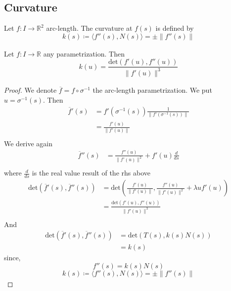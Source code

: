 \subsection{Curvature}
\label{subsec:Curvature}
\begin{defn}[Curvature]
    Let $ f : I \to \mathbb{R}^2 $ arc-length. The curvature at $ f(s)  $ is defined by 
    \[
        k(s) \coloneqq \langle f''(s)  , N(s)  \rangle = \pm \| f''(s) \|^{ }_{ } 
    \]
    \label{def:Curvature}
\end{defn}
\begin{prop}[]
    Let $ f : I \to \mathbb{R} $ any parametrization. Then 
    \[
        k(u) = \frac{ \text{det} \left( f'(u), f''(u) \right)  }{ \| f'(u) \|^{3 }_{ }  } 
    \]
    \label{def:}
\end{prop}

\begin{proof}
    We denote $ \overline{f} = f \circ \sigma^{-1}  $ the arc-length parametrization. We
    put $ u = \sigma^{-1}(s)  $. Then 
    \begin{align*}
        \overline{f}'(s) &= f'\left( \sigma^{-1}(s) \right) \frac{ 1 }{ \| f'\left( \sigma^{-1}
        (s)\right)  \|^{ }_{ }  }  \\
                     &= \frac{ f'(u) }{ \| f'(u) \|^{ }_{ }  }  \\ 
    \end{align*}
    We derive again 
    \begin{align*}
        \overline{f}''(s)  &= \frac{ f''(u) }{ \| f'(u) \|^{2 }_{ }  } + f'(u) \frac{ d }{
        ds}  \\ 
    \end{align*}
    where $ \frac{ d }{ ds }  $ is the real value result of the rhs above 
    \begin{align*}
        \text{det} \left( \overline{f}'(s), \overline{f}''(s) \right)  &= \text{det}
        \left( \frac{ f'(u) }{ \| f'(u) \|^{ }_{ }} , \frac{ f''(u) }{ \| f'(u) \|^{2 }_{
            }}
        + \lambda u f'(u)   \right)  \\ 
                                                                       &=
                                                                       \frac{\text{det}
                                                                       \left(f'(u), f''(u)
                                                                   \right)  }{ \| f'(u)
                                                               \|^{3 }_{ }   }  \\ 
    \end{align*}
    And 
    \begin{align*}
        \text{det} \left( \overline{f}'(s) , \overline{f}''(s) \right) &= \text{det} \left( T(s),
        k(s)N(s)\right) \\
        &= k(s)
    \end{align*}
    since, 
    \[
        f''(s) = k(s)N(s) 
    \]
    \[
        k(s) \coloneqq \langle f''(s) , N(s) \rangle = \pm \| f''(s) \|^{ }_{ } 
    \]
\end{proof}

